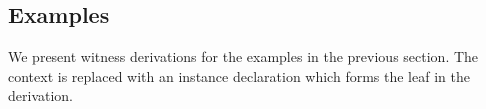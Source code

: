 





\subsection{Examples}

We present witness derivations for the examples in the previous section.
The context is replaced with an instance declaration which forms the leaf in the derivation.

